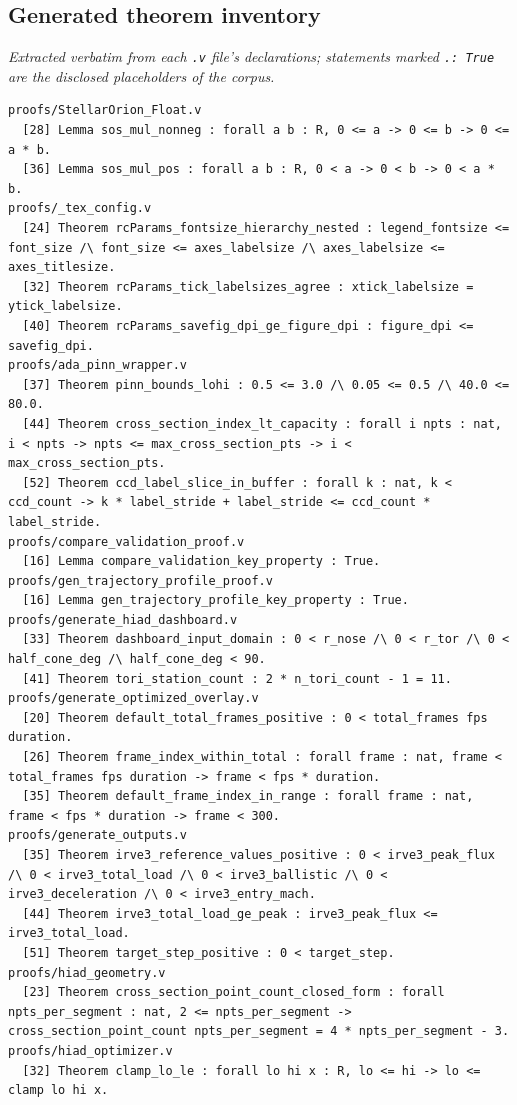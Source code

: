 \documentclass[11pt]{article}
\theoremstyle{definition}
\begin{document}
\subsection*{Generated theorem inventory}
\emph{Extracted verbatim from each \texttt{.v} file's declarations; statements marked \texttt{.:\ True} are the disclosed placeholders of the corpus.}
\begin{verbatim}
proofs/StellarOrion_Float.v
  [28] Lemma sos_mul_nonneg : forall a b : R, 0 <= a -> 0 <= b -> 0 <= a * b.
  [36] Lemma sos_mul_pos : forall a b : R, 0 < a -> 0 < b -> 0 < a * b.
proofs/_tex_config.v
  [24] Theorem rcParams_fontsize_hierarchy_nested : legend_fontsize <= font_size /\ font_size <= axes_labelsize /\ axes_labelsize <= axes_titlesize.
  [32] Theorem rcParams_tick_labelsizes_agree : xtick_labelsize = ytick_labelsize.
  [40] Theorem rcParams_savefig_dpi_ge_figure_dpi : figure_dpi <= savefig_dpi.
proofs/ada_pinn_wrapper.v
  [37] Theorem pinn_bounds_lohi : 0.5 <= 3.0 /\ 0.05 <= 0.5 /\ 40.0 <= 80.0.
  [44] Theorem cross_section_index_lt_capacity : forall i npts : nat, i < npts -> npts <= max_cross_section_pts -> i < max_cross_section_pts.
  [52] Theorem ccd_label_slice_in_buffer : forall k : nat, k < ccd_count -> k * label_stride + label_stride <= ccd_count * label_stride.
proofs/compare_validation_proof.v
  [16] Lemma compare_validation_key_property : True.
proofs/gen_trajectory_profile_proof.v
  [16] Lemma gen_trajectory_profile_key_property : True.
proofs/generate_hiad_dashboard.v
  [33] Theorem dashboard_input_domain : 0 < r_nose /\ 0 < r_tor /\ 0 < half_cone_deg /\ half_cone_deg < 90.
  [41] Theorem tori_station_count : 2 * n_tori_count - 1 = 11.
proofs/generate_optimized_overlay.v
  [20] Theorem default_total_frames_positive : 0 < total_frames fps duration.
  [26] Theorem frame_index_within_total : forall frame : nat, frame < total_frames fps duration -> frame < fps * duration.
  [35] Theorem default_frame_index_in_range : forall frame : nat, frame < fps * duration -> frame < 300.
proofs/generate_outputs.v
  [35] Theorem irve3_reference_values_positive : 0 < irve3_peak_flux /\ 0 < irve3_total_load /\ 0 < irve3_ballistic /\ 0 < irve3_deceleration /\ 0 < irve3_entry_mach.
  [44] Theorem irve3_total_load_ge_peak : irve3_peak_flux <= irve3_total_load.
  [51] Theorem target_step_positive : 0 < target_step.
proofs/hiad_geometry.v
  [23] Theorem cross_section_point_count_closed_form : forall npts_per_segment : nat, 2 <= npts_per_segment -> cross_section_point_count npts_per_segment = 4 * npts_per_segment - 3.
proofs/hiad_optimizer.v
  [32] Theorem clamp_lo_le : forall lo hi x : R, lo <= hi -> lo <= clamp lo hi x.

\end{verbatim}
\end{document}
